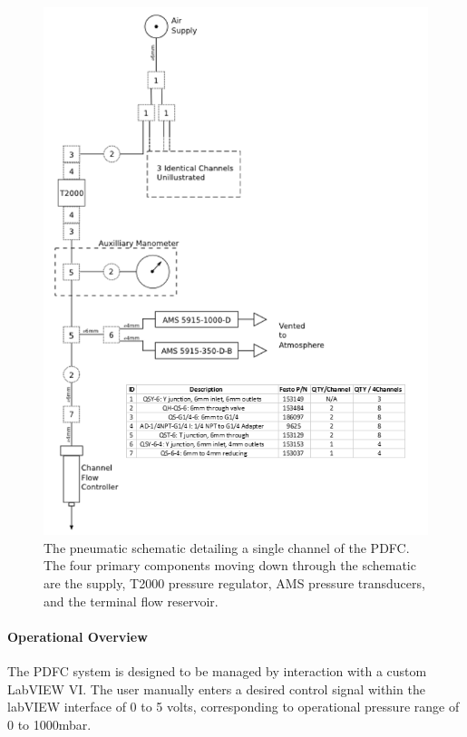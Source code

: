 \begin{figure}[H]
\centering 
\includegraphics[width=1.0\columnwidth]{pneumaticSchematic.PNG} 
\caption[Pneumatic Schematic of PDFC channel]{The pneumatic schematic detailing a single channel of the PDFC. The four primary components moving down through the schematic are the supply, T2000 pressure regulator, AMS pressure transducers, and the terminal flow reservoir.} 
\label{fig:pneumaticSchematic} 
\end{figure}

\paragraph{Operational Overview} The PDFC system is designed to be managed by interaction with a custom LabVIEW VI. The user manually enters a desired control signal within the labVIEW interface of 0 to 5 volts, corresponding to operational pressure range of 0 to 1000mbar.


